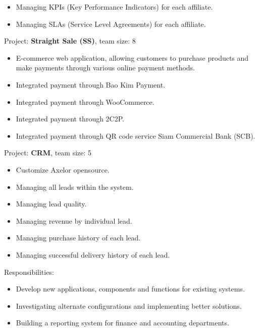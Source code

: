 {\begin{cvitems}
{\begin{itemize}
                \item { Managing KPIs (Key Performance Indicators) for each affiliate. }
                \item { Managing SLAs (Service Level Agreements) for each affiliate. }
            \end{itemize}
        }
        \item { Project: \textbf{Straight Sale (SS)}, team size: 8 }
        {
            \begin{itemize}
                \item { E-commerce web application, allowing customers to purchase products and make payments through various online payment methods. }
                \item { Integrated payment through Bao Kim Payment. }
                \item { Integrated payment through WooCommerce. }
                \item { Integrated payment through 2C2P. }
                \item { Integrated payment through QR code service Siam Commercial Bank (SCB). }
            \end{itemize}
        }
        \item { Project: \textbf{CRM}, team size: 5 }
        {
            \begin{itemize}
                \item { Customize Axelor opensource. }
                \item { Managing all leads within the system. }
                \item { Managing lead quality. }
                \item { Managing revenue by individual lead. }
                \item { Managing purchase history of each lead. }
                \item { Managing successful delivery history of each lead. }
            \end{itemize}
        }
        \item {Responsibilities: }
        {
            \begin{itemize} %
                \item { Develop new applications, components and functions for existing systems. }
                \item { Investigating alternate configurations and implementing better solutions. }
                \item { Building a reporting system for finance and accounting departments. }

\end{itemize}}
\end{cvitems}}
